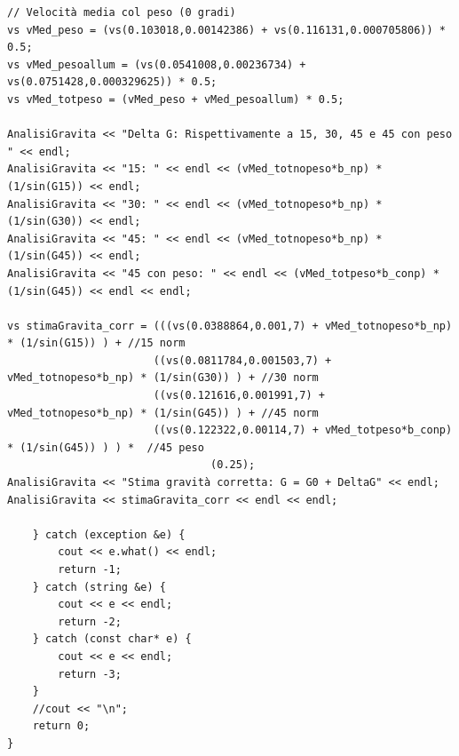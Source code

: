 \documentclass[12pt]{article} %
\begin{document}
\begin{verbatim}
// Velocità media col peso (0 gradi)
vs vMed_peso = (vs(0.103018,0.00142386) + vs(0.116131,0.000705806)) * 0.5;
vs vMed_pesoallum = (vs(0.0541008,0.00236734) + vs(0.0751428,0.000329625)) * 0.5;
vs vMed_totpeso = (vMed_peso + vMed_pesoallum) * 0.5;

AnalisiGravita << "Delta G: Rispettivamente a 15, 30, 45 e 45 con peso " << endl;
AnalisiGravita << "15: " << endl << (vMed_totnopeso*b_np) * (1/sin(G15)) << endl;
AnalisiGravita << "30: " << endl << (vMed_totnopeso*b_np) * (1/sin(G30)) << endl;
AnalisiGravita << "45: " << endl << (vMed_totnopeso*b_np) * (1/sin(G45)) << endl;
AnalisiGravita << "45 con peso: " << endl << (vMed_totpeso*b_conp) * (1/sin(G45)) << endl << endl;

vs stimaGravita_corr = (((vs(0.0388864,0.001,7) + vMed_totnopeso*b_np) * (1/sin(G15)) ) + //15 norm
	  	   	   	   	   ((vs(0.0811784,0.001503,7) + vMed_totnopeso*b_np) * (1/sin(G30)) ) + //30 norm
	  	   	   	   	   ((vs(0.121616,0.001991,7) + vMed_totnopeso*b_np) * (1/sin(G45)) ) + //45 norm
	  	   	   	   	   ((vs(0.122322,0.00114,7) + vMed_totpeso*b_conp) * (1/sin(G45)) ) ) *  //45 peso
	  	   	   	   			   	(0.25);
AnalisiGravita << "Stima gravità corretta: G = G0 + DeltaG" << endl;
AnalisiGravita << stimaGravita_corr << endl << endl;

	} catch (exception &e) {
		cout << e.what() << endl;
		return -1;
	} catch (string &e) {
		cout << e << endl;
		return -2;
	} catch (const char* e) {
		cout << e << endl;
		return -3;
	}
	//cout << "\n";
	return 0;
}



	\end{verbatim}
\end{document}
